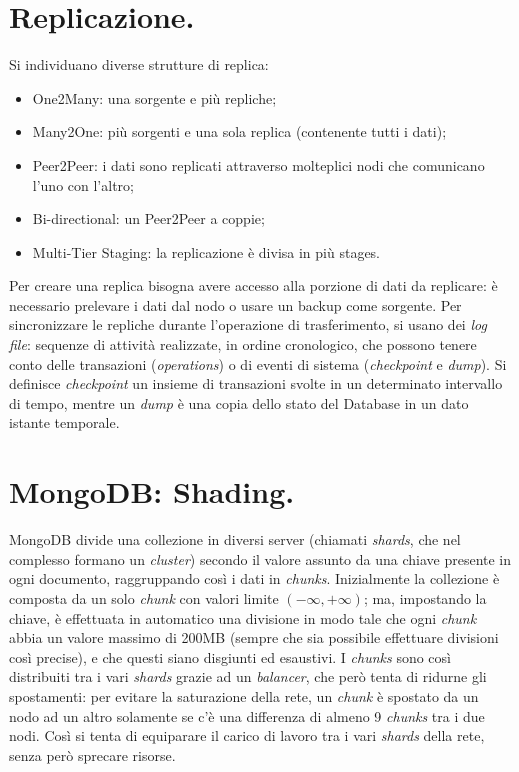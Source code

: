 \documentclass[a4page, 11pt]{article}
\begin{document}
\section{Replicazione.}
Si individuano diverse strutture di replica:
\begin{itemize}
\item One2Many: una sorgente e più repliche;
\item Many2One: più sorgenti e una sola replica (contenente tutti i dati);
\item Peer2Peer: i dati sono replicati attraverso molteplici nodi che comunicano l'uno con l'altro;
\item Bi-directional: un Peer2Peer a coppie;
\item Multi-Tier Staging: la replicazione è divisa in più stages.
\end{itemize}

Per creare una replica bisogna avere accesso alla porzione di dati da replicare: è necessario prelevare i dati dal nodo o usare un backup come sorgente.
Per sincronizzare le repliche durante l'operazione di trasferimento, si usano dei \textit{log file}: sequenze di attività realizzate, in ordine cronologico, che possono tenere conto delle transazioni (\textit{operations}) o di eventi di sistema (\textit{checkpoint} e \textit{dump}).
Si definisce \textit{checkpoint} un insieme di transazioni svolte in un determinato intervallo di tempo, mentre un \textit{dump} è una copia dello stato del Database in un dato istante temporale.

\section{MongoDB: Shading\cite{ScalingMongoDB}.}
MongoDB divide una collezione in diversi server (chiamati \textit{shards}, che nel complesso formano un \textit{cluster}) secondo il valore assunto da una chiave presente in ogni documento, raggruppando così i dati in \textit{chunks}.
Inizialmente la collezione è composta da un solo \textit{chunk} con valori limite $(-\infty, +\infty)$; ma, impostando la chiave, è effettuata in automatico una divisione in modo tale che ogni \textit{chunk} abbia un valore massimo di 200MB (sempre che sia possibile effettuare divisioni così precise), e che questi siano disgiunti ed esaustivi.
I \textit{chunks} sono così distribuiti tra i vari \textit{shards} grazie ad un \textit{balancer}, che però tenta di ridurne gli spostamenti: per evitare la saturazione della rete, un \textit{chunk} è spostato da un nodo ad un altro solamente se c'è una differenza di almeno 9 \textit{chunks} tra i due nodi.
Così si tenta di equiparare il carico di lavoro tra i vari \textit{shards} della rete, senza però sprecare risorse.
\end{document}
